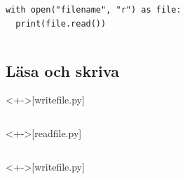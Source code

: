 \begin{frame}[fragile]
  \begin{example}
    \inputminted[firstline=3,lastline=16,firstnumber=3]{python}{examples/open_close.py}
  \end{example}
\end{frame}


\begin{frame}[fragile]
  \begin{verbatim}
with open("filename", "r") as file:
  print(file.read())
  \end{verbatim}
\end{frame}

\begin{frame}[fragile]
  \begin{example}
    \inputminted[firstline=17,lastline=27,firstnumber=17]{python}{examples/open_close.py}
  \end{example}
\end{frame}

\subsection{Läsa och skriva}

\begin{frame}[fragile]
  \begin{example}<+->[write\textunderscore file.py]
    \inputminted[firstline=5,lastline=9,firstnumber=5]{python}{examples/write_file.py}
  \end{example}

  \begin{example}<+->[read\textunderscore file.py]
    \inputminted[firstline=5,lastline=11,firstnumber=5]{python}{examples/read_file.py}
  \end{example}
\end{frame}

\begin{frame}[fragile]
  \begin{example}<+->[write\textunderscore file.py]
    \inputminted[firstline=5,lastline=9,firstnumber=5]{python}{examples/write_file.py}
  \end{example}

  \begin{example}
    \inputminted[firstline=16,lastline=20,firstnumber=5,highlightlines={7-8}]{python}{examples/read_file.py}
  \end{example}
\end{frame}

